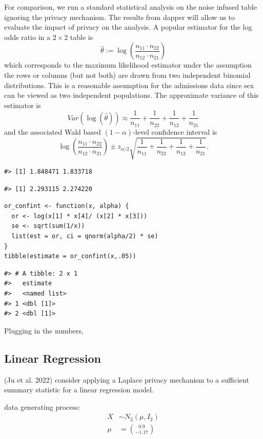 For comparison, we run a standard statistical analysis
on the noise infused table ignoring the privacy mechanism. The results from dapper
will allow us to evaluate the impact of privacy on the analysis. A popular estimator for the log odds ratio
in a \(2 \times 2\) table is
\[
\hat{\theta} := \log\left(\dfrac{n_{11} \cdot n_{22}}{n_{12} \cdot n_{21}}\right) 
\]
which corresponds to the maximum likelihood estimator under the assumption
the rows or columns (but not both) are drawn from two independent binomial distributions.
This is a reasonable assumption for the admissions data since sex can be viewed
as two independent populations. The approximate variance of this estimator is
\[
Var(\log(\hat{\theta})) \approx \dfrac{1}{n_{11}} + \dfrac{1}{n_{22}} + \dfrac{1}{n_{12}} + \dfrac{1}{n_{21}}
\]
and the associated Wald based \((1-\alpha)\)-level confidence interval is
\[
\log\left(\dfrac{n_{11} \cdot n_{22}}{n_{12} \cdot n_{21}}\right) 
  \pm z_{\alpha/2}\sqrt{\dfrac{1}{n_{11}} + \dfrac{1}{n_{22}} + \dfrac{1}{n_{12}} + \dfrac{1}{n_{21}}}.
\]

\begin{verbatim}
#> [1] 1.848471 1.833718
\end{verbatim}

\begin{verbatim}
#> [1] 2.293115 2.274220
\end{verbatim}

\begin{verbatim}
or_confint <- function(x, alpha) {
  or <- log(x[1] * x[4]/ (x[2] * x[3]))
  se <- sqrt(sum(1/x))
  list(est = or, ci = qnorm(alpha/2) * se)
}
tibble(estimate = or_confint(x,.05))
\end{verbatim}

\begin{verbatim}
#> # A tibble: 2 x 1
#>   estimate    
#>   <named list>
#> 1 <dbl [1]>   
#> 2 <dbl [1]>
\end{verbatim}

Plugging in the numbers,

\hypertarget{linear-regression}{%
\subsection{Linear Regression}\label{linear-regression}}

(Ju et al. 2022) consider applying a Laplace privacy
mechanism to a sufficient summary statistic for a linear regression model.

data generating process:
\[
\begin{split}
X &\sim N_{2}(\mu, I_2)\\
\mu &= \binom{0.9}{-1.17}
\end{split}
\]

